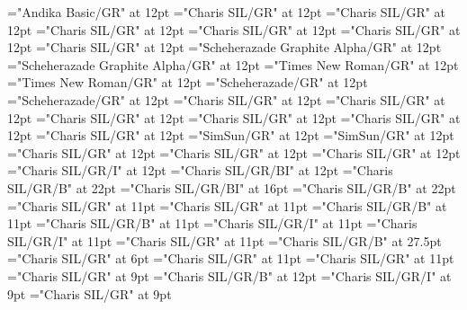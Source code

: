 \documentclass[a4paper,twoside]{article}
\begin{document}
\font\spantpi="Andika Basic/GR" at 12pt
\font\divtrfonipaxemic="Charis SIL/GR" at 12pt
\font\spantrfonipaxemic="Charis SIL/GR" at 12pt
\font\divtrfonipa="Charis SIL/GR" at 12pt
\font\spantrfonipa="Charis SIL/GR" at 12pt
\font\divtr="Charis SIL/GR" at 12pt
\font\spantr="Charis SIL/GR" at 12pt
\font\divurArab="Scheherazade Graphite Alpha/GR" at 12pt
\font\spanurArab="Scheherazade Graphite Alpha/GR" at 12pt
\font\divurxind="Times New Roman/GR" at 12pt
\font\spanurxind="Times New Roman/GR" at 12pt
\font\divur="Scheherazade/GR" at 12pt
\font\spanur="Scheherazade/GR" at 12pt
\font\divvi="Charis SIL/GR" at 12pt
\font\spanvi="Charis SIL/GR" at 12pt
\font\divxas="Charis SIL/GR" at 12pt
\font\spanxas="Charis SIL/GR" at 12pt
\font\divzhCNpinyin="Charis SIL/GR" at 12pt
\font\spanzhCNpinyin="Charis SIL/GR" at 12pt
\font\divzhCN="SimSun/GR" at 12pt
\font\spanzhCN="SimSun/GR" at 12pt
\font\picturepictureRight="Charis SIL/GR" at 12pt
\font\imgpicturedivpictureLeft="Charis SIL/GR" at 12pt
\font\scrBookscrBody="Charis SIL/GR" at 12pt
\font\scrBookNamezxxscrBookscrBody="Charis SIL/GR/I" at 12pt
\font\scrBookCodezxxscrBookscrBody="Charis SIL/GR/BI" at 12pt
\font\TitleMainscrBookscrBody="Charis SIL/GR/B" at 22pt
\font\TitleSecondaryzxxTitleMainscrBookscrBody="Charis SIL/GR/BI" at 16pt
\font\spanzxxTitleMainscrBookscrBody="Charis SIL/GR/B" at 22pt
\font\columnsscrBookscrBody="Charis SIL/GR" at 11pt
\font\scrSectioncolumnsscrBookscrBody="Charis SIL/GR" at 11pt
\font\SectionHeadscrSectioncolumnsscrBookscrBody="Charis SIL/GR/B" at 11pt
\font\spanzxxSectionHeadscrSectioncolumnsscrBookscrBody="Charis SIL/GR/B" at 11pt
\font\ParallelPassageReferencescrSectioncolumnsscrBookscrBody="Charis SIL/GR/I" at 11pt
\font\spanzxxParallelPassageReferencescrSectioncolumnsscrBookscrBody="Charis SIL/GR/I" at 11pt
\font\ParagraphscrSectioncolumnsscrBookscrBody="Charis SIL/GR" at 11pt
\font\ChapterNumberzxxParagraphscrSectioncolumnsscrBookscrBody="Charis SIL/GR/B" at 27.5pt
\font\VerseNumberzxxParagraphscrSectioncolumnsscrBookscrBody="Charis SIL/GR" at 6pt
\font\spanzxxParagraphscrSectioncolumnsscrBookscrBody="Charis SIL/GR" at 11pt
\font\scrFootnoteMarkerParagraphscrSectioncolumnsscrBookscrBody="Charis SIL/GR" at 11pt
\font\NoteGeneralParagraphParagraphscrSectioncolumnsscrBookscrBody="Charis SIL/GR" at 9pt
\font\NoteTargetReferencezxxNoteGeneralParagraphParagraphscrSectioncolumnsscrBookscrBody="Charis SIL/GR/B" at 12pt
\font\QuotedTextzxxNoteGeneralParagraphParagraphscrSectioncolumnsscrBookscrBody="Charis SIL/GR/I" at 9pt
\font\spanzxxNoteGeneralParagraphParagraphscrSectioncolumnsscrBookscrBody="Charis SIL/GR" at 9pt
\end{document}
